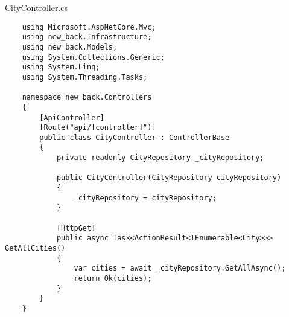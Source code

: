 CityController.cs
\lstset{style=sharpc}
\begin{lstlisting}
    using Microsoft.AspNetCore.Mvc;
    using new_back.Infrastructure;
    using new_back.Models;
    using System.Collections.Generic;
    using System.Linq;
    using System.Threading.Tasks;
    
    namespace new_back.Controllers
    {
        [ApiController]
        [Route("api/[controller]")]
        public class CityController : ControllerBase
        {
            private readonly CityRepository _cityRepository;
    
            public CityController(CityRepository cityRepository)
            {
                _cityRepository = cityRepository;
            }
    
            [HttpGet]
            public async Task<ActionResult<IEnumerable<City>>> GetAllCities()
            {
                var cities = await _cityRepository.GetAllAsync();
                return Ok(cities);
            }
        }
    }
\end{lstlisting}

